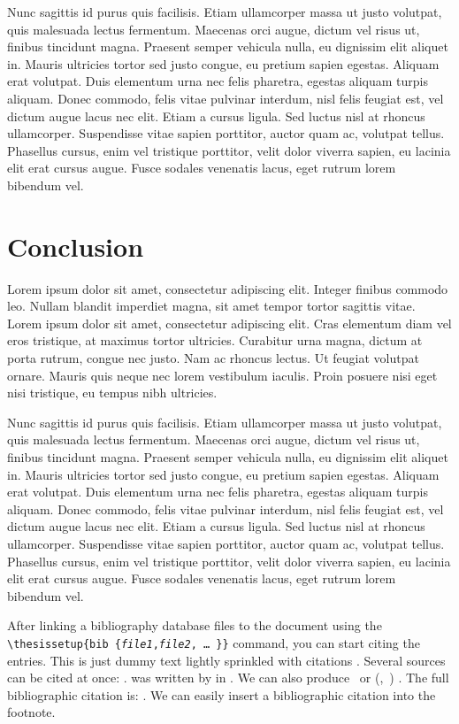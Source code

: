 \documentclass[
  digital,     %
  oneside,     %
  nosansbold,  %
  nocolorbold, %
  lof,         %
  lot,         %
]{fithesis4}
\begin{document}
Nunc sagittis id purus quis facilisis. Etiam ullamcorper massa ut justo volutpat, quis malesuada lectus fermentum. Maecenas orci augue, dictum vel risus ut, finibus tincidunt magna. Praesent semper vehicula nulla, eu dignissim elit aliquet in. Mauris ultricies tortor sed justo congue, eu pretium sapien egestas. Aliquam erat volutpat. Duis elementum urna nec felis pharetra, egestas aliquam turpis aliquam. Donec commodo, felis vitae pulvinar interdum, nisl felis feugiat est, vel dictum augue lacus nec elit. Etiam a cursus ligula. Sed luctus nisl at rhoncus ullamcorper. Suspendisse vitae sapien porttitor, auctor quam ac, volutpat tellus. Phasellus cursus, enim vel tristique porttitor, velit dolor viverra sapien, eu lacinia elit erat cursus augue. Fusce sodales venenatis lacus, eget rutrum lorem bibendum vel.
\shorthandon{-}

\chapter*{Conclusion }
\shorthandoff{-}
Lorem ipsum dolor sit amet, consectetur adipiscing elit. Integer finibus commodo leo. Nullam blandit imperdiet magna, sit amet tempor tortor sagittis vitae. Lorem ipsum dolor sit amet, consectetur adipiscing elit. Cras elementum diam vel eros tristique, at maximus tortor ultricies. Curabitur urna magna, dictum at porta rutrum, congue nec justo. Nam ac rhoncus lectus. Ut feugiat volutpat ornare. Mauris quis neque nec lorem vestibulum iaculis. Proin posuere nisi eget nisi tristique, eu tempus nibh ultricies.

Nunc sagittis id purus quis facilisis. Etiam ullamcorper massa ut justo volutpat, quis malesuada lectus fermentum. Maecenas orci augue, dictum vel risus ut, finibus tincidunt magna. Praesent semper vehicula nulla, eu dignissim elit aliquet in. Mauris ultricies tortor sed justo congue, eu pretium sapien egestas. Aliquam erat volutpat. Duis elementum urna nec felis pharetra, egestas aliquam turpis aliquam. Donec commodo, felis vitae pulvinar interdum, nisl felis feugiat est, vel dictum augue lacus nec elit. Etiam a cursus ligula. Sed luctus nisl at rhoncus ullamcorper. Suspendisse vitae sapien porttitor, auctor quam ac, volutpat tellus. Phasellus cursus, enim vel tristique porttitor, velit dolor viverra sapien, eu lacinia elit erat cursus augue. Fusce sodales venenatis lacus, eget rutrum lorem bibendum vel.
\shorthandon{-}

After linking a bibliography data\-base files to the document using
the \verb"\"\texttt{thesis\discretionary{-}{}{}setup\{bib\discretionary{=}{=}{=}%
\{\textit{file1},\textit{file2},\,\ldots\,\}\}} command, you can
start citing the entries. This is just dummy text
\parencite{borgman03} lightly sprinkled with citations
\parencite[p.~123]{greenberg98}. Several sources can be cited at
once: \cite{borgman03,greenberg98,thanh01}.
 was written by \citeauthor{greenberg98} in
\citeyear{greenberg98}. We can also produce \textcite{greenberg98}%
\ or %
\def\citeauthoryear#1{(\textcite{#1},~\citeyear{#1})}%
\citeauthoryear{greenberg98}%
. The full bibliographic citation is:
\emph{}. We can easily insert a bibliographic
citation into the footnote.

\printbibliography[heading=bibintoc]
\end{document}
